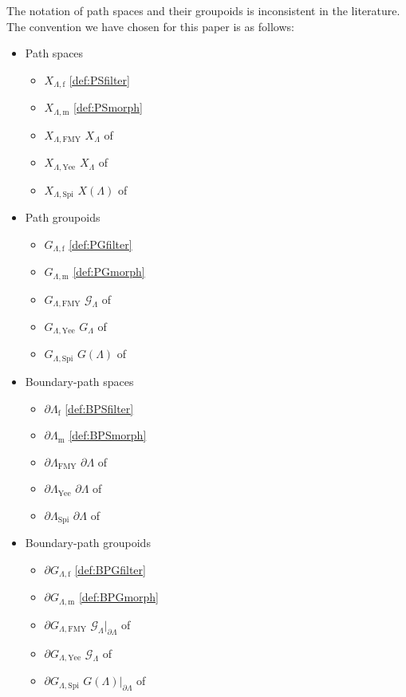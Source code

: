 \documentclass[11pt]{amsart}
\theoremstyle{definition}
\numberwithin{thm}{section}
\numberwithin{equation}{section}
\newcommand{\ofFMY}{\mathrm{FMY}}
\newcommand{\ofYeend}{\mathrm{Yee}}
\newcommand{\ofSpielberg}{\mathrm{Spi}}
\newcommand{\M}{\mathrm{m}}
\newcommand{\F}{\mathrm{f}}
\newcommand{\PS}[2]{X_{#2, #1}}
\newcommand{\PG}[2]{{G_{#2, #1}}}
\newcommand{\BPS}[2]{\partial{#2}_{#1}}
\newcommand{\BPG}[2]{\partial\PG{#1}{#2}}
\begin{document}
The notation of path spaces and their groupoids is inconsistent in the literature. 
The convention we have chosen for this paper is as follows:

\begin{itemize}
\item Path spaces
\begin{itemize}
\item $\PS{\F}{\Lambda}$ \dotfill \cref{def:PSfilter}
\item $\PS{\M}{\Lambda}$ \dotfill \cref{def:PSmorph}
\item $\PS{\ofFMY}{\Lambda}$ \dotfill $X_\Lambda$ of \cite[Definition 5.1]{FMY05}
\item $\PS{\ofYeend}{\Lambda}$ \dotfill $X_\Lambda$ of \cite[Definition 3.1]{Yee07}
\item $\PS{\ofSpielberg}{\Lambda}$ \dotfill $X(\Lambda)$ of \cite[Page 1586]{Spi20}
\end{itemize}
\item Path groupoids
\begin{itemize}
\item $\PG{\F}{\Lambda}$ \dotfill \cref{def:PGfilter}
\item $\PG{\M}{\Lambda}$ \dotfill \cref{def:PGmorph}
\item $\PG{\ofFMY}{\Lambda}$ \dotfill $\mathcal{G}_\Lambda$ of \cite[\S 6]{FMY05}
\item $\PG{\ofYeend}{\Lambda}$ \dotfill $G_\Lambda$ of \cite[Definition 3.4]{Yee07}
\item $\PG{\ofSpielberg}{\Lambda}$ \dotfill $G(\Lambda)$ of \cite[Definition 5.5]{Spi20}
\end{itemize}
\item Boundary-path spaces
\begin{itemize}
\item $\BPS{\F}{\Lambda}$ \dotfill \cref{def:BPSfilter}
\item $\BPS{\M}{\Lambda}$ \dotfill \cref{def:BPSmorph}
\item $\BPS{\ofFMY}{\Lambda}$ \dotfill $\partial\Lambda$ of \cite[Definition 5.10]{FMY05}
\item $\BPS{\ofYeend}{\Lambda}$ \dotfill $\partial\Lambda$ of \cite[Definition 4.2]{Yee07}
\item $\BPS{\ofSpielberg}{\Lambda}$ \dotfill $\partial\Lambda$ of \cite[Definition 10.2]{Spi20}
\end{itemize}
\item Boundary-path groupoids
\begin{itemize}
\item $\BPG{\F}{\Lambda}$ \dotfill \cref{def:BPGfilter}
\item $\BPG{\M}{\Lambda}$ \dotfill \cref{def:BPGmorph}
\item $\BPG{\ofFMY}{\Lambda}$ \dotfill $\mathcal{G}_\Lambda|_{\partial\Lambda}$ of \cite[Page 181]{FMY05}
\item $\BPG{\ofYeend}{\Lambda}$ \dotfill $\mathcal{G}_\Lambda$ of \cite[Definition 4.8]{Yee07}
\item $\BPG{\ofSpielberg}{\Lambda}$ \dotfill $G(\Lambda)|_{\partial\Lambda}$ of \cite[Page 1602]{Spi20}
\end{itemize}
\end{itemize}
\end{document}
